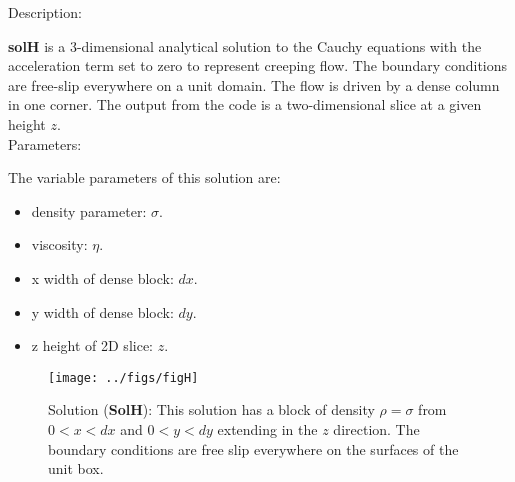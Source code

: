   {\large \fontB Description:}
  
  {\bf solH} is a 3-dimensional analytical solution to the Cauchy equations with the acceleration term set to zero
  to represent creeping flow. The boundary conditions are free-slip everywhere on a unit domain. 
  The flow is driven by a dense column in one corner. The output from the code is a two-dimensional slice
  at a given height $z$.
  \\

  {\large \fontB Parameters:}
 
  The variable parameters of this solution are:
  \begin{itemize}
    \item{density parameter: $ \sigma $.}
    \item{viscosity: $\eta$.}
    \item{x width of dense block: $dx$.}
    \item{y width of dense block: $dy$.}
    \item{z height of 2D slice: $z$.}
    \end{itemize}

  \begin{SCfigure}[][h]
    \texttt{[image: ../figs/figH]}
    \caption[Short caption]{\label{figH} 
      Solution ({\bf SolH}):
      This solution has a block of density $\rho = \sigma$
       from $ 0 < x < dx $ and $ 0 < y < dy $ extending in the $z$ direction.
      The boundary conditions are free slip everywhere on the surfaces of the unit box.}
  \end{SCfigure} 
  

